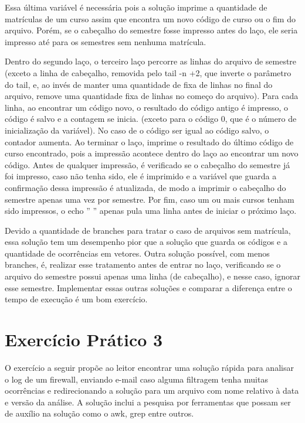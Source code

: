 \documentclass[oneside, 11 pt]{article}
\begin{document}
	Essa última variável é necessária pois a solução imprime a quantidade de matrículas de um curso assim que encontra um novo código de curso ou o fim do arquivo. Porém, se o cabeçalho do semestre fosse impresso antes do laço, ele seria impresso até para os semestres sem nenhuma matrícula.
	
	Dentro do segundo laço, o terceiro laço percorre as linhas do arquivo de semestre (exceto a linha de cabeçalho, removida pelo tail -n +2, que inverte o parâmetro do tail, e, ao invés de manter uma quantidade de fixa de linhas no final do arquivo, remove uma quantidade fixa de linhas no começo do arquivo). Para cada linha, ao encontrar um código novo, o resultado do código antigo é impresso, o código é salvo e a contagem se inicia. (exceto para o código 0, que é o número de inicialização da variável). No caso de o código ser igual ao código salvo, o contador aumenta. Ao terminar o laço, imprime o resultado do último código de curso encontrado, pois a impressão acontece dentro do laço ao encontrar um novo código. Antes de qualquer impressão, é verificado se o cabeçalho do semestre já foi impresso, caso não tenha sido, ele é imprimido e a variável que guarda a confirmação dessa impressão é atualizada, de modo a imprimir o cabeçalho do semestre apenas uma vez por semestre. Por fim, caso um ou mais cursos tenham sido impressos, o echo ” ” apenas pula uma linha antes de iniciar o próximo laço.
	
	Devido a quantidade de branches para tratar o caso de arquivos sem matrícula, essa solução tem um desempenho pior que a solução que guarda os códigos e a quantidade de ocorrências em vetores. Outra solução possível, com menos branches, é, realizar esse tratamento antes de entrar no laço, verificando se o arquivo do semestre possui apenas uma linha (de cabeçalho), e nesse caso, ignorar esse semestre. Implementar essas outras soluções e comparar a diferença entre o tempo de execução é um bom exercício.
	
	\newpage
	\part{Exercício Prático 3}
	
	O exercício a seguir propõe ao leitor encontrar uma solução rápida para analisar o log de um firewall, enviando e-mail caso alguma filtragem tenha muitas ocorrências e redirecionando a solução para um arquivo com nome relativo à data e versão da análise. A solução inclui a pesquisa por ferramentas que possam ser de auxílio na solução como o awk, grep entre outros.
	
\end{document}
